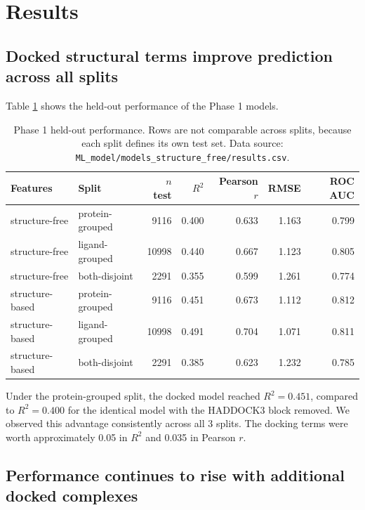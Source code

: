 \documentclass[11pt]{article}
\begin{document}
\section{Results}

\subsection{Docked structural terms improve prediction across all splits}

Table \ref{tab:phase1} shows the held-out performance of the Phase 1 models.

\begin{table}[H]
\centering
\caption{Phase 1 held-out performance. Rows are not comparable across splits,
because each split defines its own test set. Data source:
\texttt{ML\_model/models\_structure\_free/results.csv}.}
\label{tab:phase1}
\begin{tabular}{llrrrrr}
\toprule
Features & Split & $n$ test & $R^2$ & Pearson $r$ & RMSE & ROC AUC \\
\midrule
structure-free  & protein-grouped & 9116  & 0.400 & 0.633 & 1.163 & 0.799 \\
structure-free  & ligand-grouped  & 10998 & 0.440 & 0.667 & 1.123 & 0.805 \\
structure-free  & both-disjoint   & 2291  & 0.355 & 0.599 & 1.261 & 0.774 \\
structure-based & protein-grouped & 9116  & 0.451 & 0.673 & 1.112 & 0.812 \\
structure-based & ligand-grouped  & 10998 & 0.491 & 0.704 & 1.071 & 0.811 \\
structure-based & both-disjoint   & 2291  & 0.385 & 0.623 & 1.232 & 0.785 \\
\bottomrule
\end{tabular}
\end{table}

Under the protein-grouped split, the docked model reached $R^2 = 0.451$,
compared to $R^2 = 0.400$ for the identical model with the HADDOCK3 block
removed. We observed this advantage consistently across all 3 splits. The
docking terms were worth approximately 0.05 in $R^2$ and 0.035 in Pearson $r$.

\subsection{Performance continues to rise with additional docked complexes}
\label{sec:curve-results}
\end{document}

